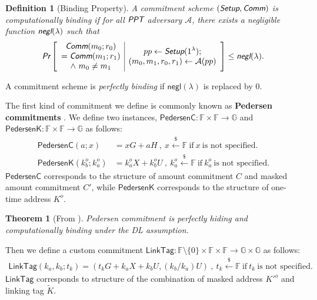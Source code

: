 \documentclass{article}
\newtheorem{definition}{Definition}[section]
\newtheorem{theorem}{Theorem}[section]
\begin{document}
\begin{definition}[Binding Property]
A commitment scheme $(\emph{\textsf{Setup}}, \emph{\textsf{Comm}})$ is computationally binding if for all $\emph{\textsf{PPT}}$ adversary $\mathcal{A}$, there exists a negligible function $\emph{\textsf{negl}}(\lambda)$ such that
\begin{align*}
\emph{\textsf{Pr}}
\left[
\begin{array}{c|c}
    \begin{gathered}
         \emph{\textsf{Comm}}(m_0;r_0) \\
        = \emph{\textsf{Comm}}(m_1;r_1) \\
        \wedge\ m_0 \ne m_1
    \end{gathered}
    &
    \begin{gathered}
        pp\leftarrow\emph{\textsf{Setup}}(1^{\lambda}); \\
        (m_0,m_1,r_0,r_1)\leftarrow\mathcal{A}(pp)
    \end{gathered}
\end{array}
\right]
\le \emph{\textsf{negl}}(\lambda).
\end{align*}
\end{definition}
A commitment scheme is \textit{perfectly binding} if $\textsf{negl}(\lambda)$ is replaced by $0$.

\noindent The first kind of commitment we define is commonly known as \textbf{Pedersen commitments} \cite{pedersen}. We define two instances, $\textsf{PedersenC}:\mathbb{F}\times\mathbb{F}\rightarrow\mathbb{G}$ and $\textsf{PedersenK}:\mathbb{F}\times\mathbb{F}\rightarrow\mathbb{G}$ as follows:
\begin{align*}
\textsf{PedersenC}(a; x) &= x G + a H \ , \ x\xleftarrow{\$}\mathbb{F}\ \text{if}\ x\ \text{is not specified.} \\
\textsf{PedersenK}(k_b^o;k_a^o) &= k_a^o X + k_b^o U \ , \ k_a^o\xleftarrow{\$}\mathbb{F}\ \text{if}\ k_a^o\ \text{is not specified.}
\end{align*}
$\textsf{PedersenC}$ corresponds to the structure of amount commitment $C$ and masked amount commitment $C'$, while $\textsf{PedersenK}$ corresponds to the structure of one-time address $K^o$.
\begin{theorem}[From \cite{pedersen}]\label{thm-pedersen}
Pedersen commitment is perfectly hiding and computationally binding under the DL assumption.
\end{theorem}

\noindent Then we define a custom commitment $\textsf{LinkTag}:\mathbb{F}\setminus\{0\}\times\mathbb{F}\times\mathbb{F}\rightarrow\mathbb{G}\times\mathbb{G}$ as follows:
\begin{align*}
\textsf{LinkTag}(k_a, k_b; t_k) = (t_k G + k_a X + k_b U, (k_b/k_a)U)\ , \ t_k\xleftarrow{\$}\mathbb{F}\ \text{if}\ t_k\ \text{is not specified.}
\end{align*}
$\textsf{LinkTag}$ corresponds to structure of the combination of masked address $K'^o$ and linking tag $\tilde{K}$.
\end{document}
